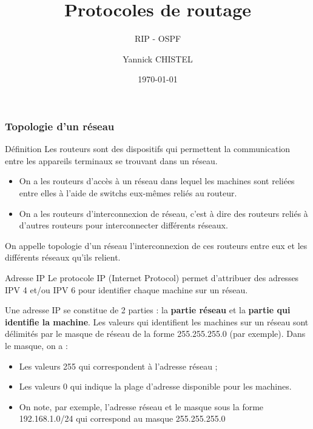 \documentclass[8pt]{beamer}
\title{Protocoles de routage}
\subtitle{RIP - OSPF}
\author{Yannick CHISTEL}
\institute{Lycée Dumont d'Urville - CAEN}
\date{\today}
\begin{document}
 
\frame{\titlepage}

\begin{frame}
\frametitle{Topologie d'un réseau}
\begin{block}{Définition}
Les routeurs sont des dispositifs qui permettent la communication entre les appareils terminaux se trouvant dans un réseau.
\begin{itemize}
\item On a les routeurs d'accès à un réseau dans lequel les machines sont reliées entre elles à l'aide de switchs eux-mêmes reliés au routeur.
\item On a les routeurs d'interconnexion de réseau, c'est à dire des routeurs reliés à d'autres routeurs  pour interconnecter différents réseaux.
\end{itemize}
On appelle topologie d'un réseau l'interconnexion de ces routeurs entre eux et les différents réseaux qu'ils relient.
\end{block}

\begin{block}{Adresse IP}
Le protocole IP (Internet Protocol) permet d'attribuer des adresses IPV 4 et/ou IPV 6 pour identifier chaque machine sur un réseau.

Une adresse IP se constitue de 2 parties : la \textbf{partie réseau} et la \textbf{partie qui identifie la machine}. Les valeurs qui identifient les machines sur un réseau sont délimités par le masque de réseau de la forme 255.255.255.0 (par exemple). Dans le masque, on a :
\begin{itemize}
\item Les valeurs 255 qui correspondent à l'adresse réseau ;
\item Les valeurs 0 qui indique la plage d'adresse disponible pour les machines.
\item On note, par exemple, l'adresse réseau et le masque sous la forme 192.168.1.0/24 qui correspond au masque 255.255.255.0
\end{itemize}
\end{block}

\end{frame}
\end{document}
